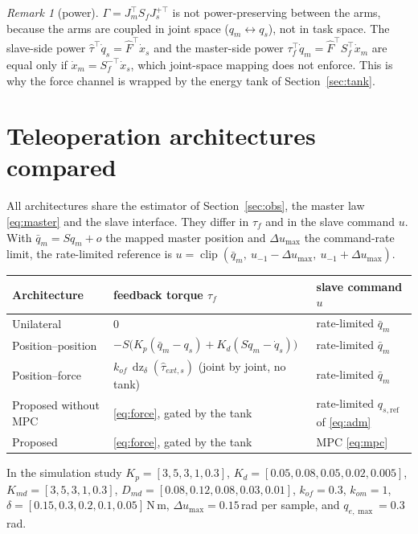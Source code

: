 \documentclass[11pt,a4paper]{article}
\theoremstyle{remark}
\newtheorem{remark}[theorem]{Remark}
\theoremstyle{definition}
\newcommand{\dz}{\operatorname{dz}}
\newcommand{\clip}{\operatorname{clip}}
\begin{document}
\begin{remark}[power]
$\Gamma=J_m^\top S_fJ_s^{+\top}$ is not power-preserving between the arms, because the arms are coupled in joint space ($q_m\leftrightarrow q_s$), not in task space. The slave-side power
$\hat\tau^\top\dot q_s=\hat F^\top\dot x_s$ and the master-side power $\tau_f^\top\dot q_m=\hat F^\top S_f^\top\dot x_m$ are equal only if $\dot x_m=S_f^{-\top}\dot x_s$, which joint-space mapping does not enforce.
This is why the force channel is wrapped by the energy tank of Section~\ref{sec:tank}.
\end{remark}

\section{Teleoperation architectures compared}\label{sec:baselines}
All architectures share the estimator of Section~\ref{sec:obs}, the master law \eqref{eq:master} and the slave interface. They differ in $\tau_f$ and in the slave command $u$.
With $\bar q_m=Sq_m+o$ the mapped master position and $\Delta u_{\max}$ the command-rate limit, the rate-limited reference is
$u=\clip(\bar q_m,\ u_{-1}-\Delta u_{\max},\ u_{-1}+\Delta u_{\max})$.
\begin{center}\small
\begin{tabular}{@{}lll@{}}
\toprule
Architecture & feedback torque $\tau_f$ & slave command $u$\\
\midrule
Unilateral & $0$ & rate-limited $\bar q_m$\\
Position--position & $-S\big(K_p(\bar q_m-q_s)+K_d(S\dot q_m-\dot q_s)\big)$ & rate-limited $\bar q_m$\\
Position--force & $k_{of}\,\dz_\delta(\hat\tau_{ext,s})$ (joint by joint, no tank) & rate-limited $\bar q_m$\\
Proposed without MPC & \eqref{eq:force}, gated by the tank & rate-limited $q_{s,\mathrm{ref}}$ of \eqref{eq:adm}\\
Proposed & \eqref{eq:force}, gated by the tank & MPC \eqref{eq:mpc}\\
\bottomrule
\end{tabular}
\end{center}
In the simulation study $K_p=[3,5,3,1,0.3]$, $K_d=[0.05,0.08,0.05,0.02,0.005]$, $K_{md}=[3,5,3,1,0.3]$, $D_{md}=[0.08,0.12,0.08,0.03,0.01]$, $k_{of}=0.3$, $k_{om}=1$,
$\delta=[0.15,0.3,0.2,0.1,0.05]$\,N\,m, $\Delta u_{\max}=0.15$\,rad per sample, and $q_{e,\max}=0.3$\,rad.
\end{document}
